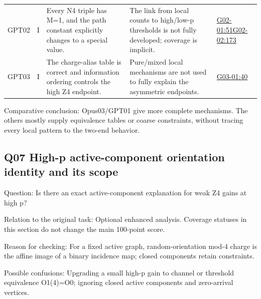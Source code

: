 \documentclass[11pt,a4paper]{article}
\begin{document}
{\begin{longtable}
{}GPT02 & I & Every N4 triple has M=1,\allowbreak{} and the path constant explicitly changes to a special value. & The link from local counts to high/\allowbreak{}low-p thresholds is not fully developed; coverage is implicit. & \hyperref[src:G02-01]{G02-01:51}\newline \hyperref[src:G02-02]{G02-02:173}\tabularnewline
{}GPT03 & I & The charge-alias table is correct and information ordering controls the high Z4 endpoint. & Pure/\allowbreak{}mixed local mechanisms are not used to fully explain the asymmetric endpoints. & \hyperref[src:G03-01]{G03-01:40}\tabularnewline
\bottomrule
\end{longtable}
}
Comparative conclusion: Opus03/\allowbreak{}GPT01 give more complete mechanisms. The others mostly supply equivalence tables or coarse constraints,\allowbreak{} without tracing every local pattern to the two-end behavior.

\clearpage
\subsection{Q07 High-p active-component orientation identity and its scope}
\label{aspect:Q07}
Question: Is there an exact active-component explanation for weak Z4 gains at high p?

Relation to the original task: Optional enhanced analysis. Coverage statuses in this section do not change the main 100-point score.

Reason for checking: For a fixed active graph,\allowbreak{} random-orientation mod-4 charge is the affine image of a binary incidence map; closed components retain constraints.

Possible confusions: Upgrading a small high-p gain to channel or threshold equivalence O1(4)=O0; ignoring closed active components and zero-arrival vertices.
\end{document}
